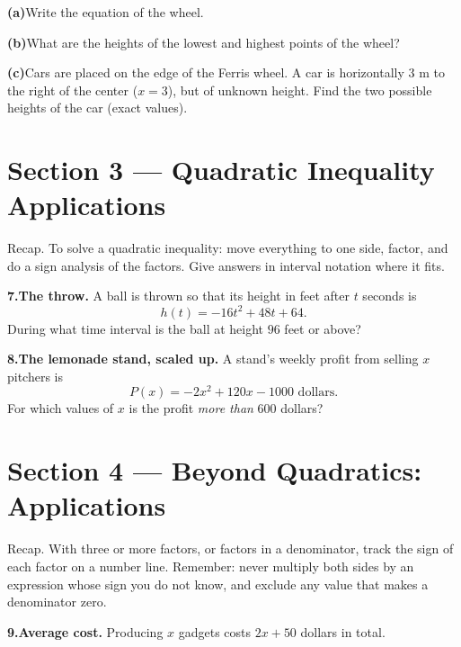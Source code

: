\documentclass[12pt]{article}
\begin{document}
\medskip
\textbf{(a)}\quad Write the equation of the wheel.

\vspace{3cm}
\textbf{(b)}\quad What are the heights of the lowest and highest points of the wheel?

\vspace{3cm}
\textbf{(c)}\quad Cars are placed on the edge of the Ferris wheel. A car is horizontally $3$ m to the right of the center ($x = 3$), but of unknown height. Find the two possible heights of the car (exact values).

\vspace{4cm}

\newpage
\section*{Section 3 --- Quadratic Inequality Applications}
Recap. To solve a quadratic inequality: move everything to one side, factor, and do a sign analysis of the factors. Give answers in interval notation where it fits.

\medskip
\textbf{7.}\quad \textbf{The throw.} A ball is thrown so that its height in feet after $t$ seconds is
\[
  h(t) = -16t^2 + 48t + 64 .
\]
During what time interval is the ball at height $96$ feet or above?

\vspace{7cm}
\textbf{8.}\quad \textbf{The lemonade stand, scaled up.} A stand's weekly profit from selling $x$ pitchers is
\[
  P(x) = -2x^2 + 120x - 1000 \text{ dollars.}
\]
For which values of $x$ is the profit \emph{more than} $600$ dollars?

\vspace{7cm}

\newpage
\section*{Section 4 --- Beyond Quadratics: Applications}
Recap. With three or more factors, or factors in a denominator, track the sign of each factor on a number line. Remember: never multiply both sides by an expression whose sign you do not know, and exclude any value that makes a denominator zero.

\medskip
\textbf{9.}\quad \textbf{Average cost.} Producing $x$ gadgets costs $2x + 50$ dollars in total.
\end{document}
